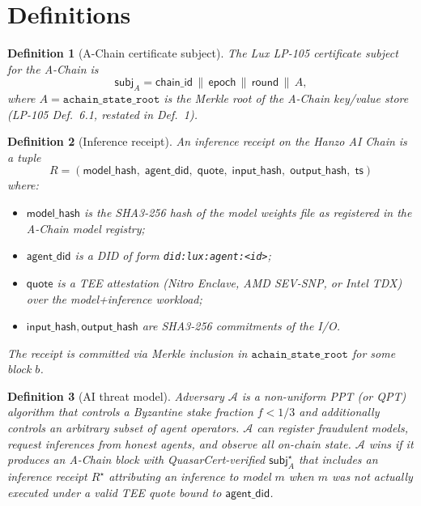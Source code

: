 \documentclass[11pt]{article}
\newtheorem{definition}{Definition}
\begin{document}
\section{Definitions}
\label{sec:def}

\begin{definition}[A-Chain certificate subject]
\label{def:a-subj}
The Lux LP-105 certificate subject for the A-Chain is
\[
  \mathsf{subj}_A = \mathsf{chain\_id}\,\|\,\mathsf{epoch}\,\|\,
                    \mathsf{round}\,\|\,A,
\]
where $A = \texttt{achain\_state\_root}$ is the Merkle root of the
A-Chain key/value store (LP-105 Def.~6.1, restated in
\cite{quasar-cert} Def.~1).
\end{definition}

\begin{definition}[Inference receipt]
\label{def:receipt}
An \emph{inference receipt} on the Hanzo AI Chain is a tuple
\[
  R = (\mathsf{model\_hash},\;
       \mathsf{agent\_did},\;
       \mathsf{quote},\;
       \mathsf{input\_hash},\;
       \mathsf{output\_hash},\;
       \mathsf{ts})
\]
where:
\begin{itemize}[nosep]
  \item $\mathsf{model\_hash}$ is the SHA3-256 hash of the model
        weights file as registered in the A-Chain model registry;
  \item $\mathsf{agent\_did}$ is a DID of form \texttt{did:lux:agent:<id>};
  \item $\mathsf{quote}$ is a TEE attestation (Nitro Enclave, AMD
        SEV-SNP, or Intel TDX) over the model+inference workload;
  \item $\mathsf{input\_hash}, \mathsf{output\_hash}$ are SHA3-256
        commitments of the I/O.
\end{itemize}
The receipt is committed via Merkle inclusion in
$\texttt{achain\_state\_root}$ for some block $b$.
\end{definition}

\begin{definition}[AI threat model]
\label{def:adv}
Adversary $\mathcal{A}$ is a non-uniform PPT (or QPT) algorithm that
controls a Byzantine stake fraction $f < 1/3$ and additionally
controls an arbitrary subset of agent operators. $\mathcal{A}$ can
register fraudulent models, request inferences from honest agents,
and observe all on-chain state. $\mathcal{A}$ \emph{wins} if it
produces an A-Chain block with QuasarCert-verified
$\mathsf{subj}_A^\star$ that includes an inference receipt $R^\star$
attributing an inference to model $m$ when $m$ was not actually
executed under a valid TEE quote bound to $\mathsf{agent\_did}$.
\end{definition}
\end{document}
